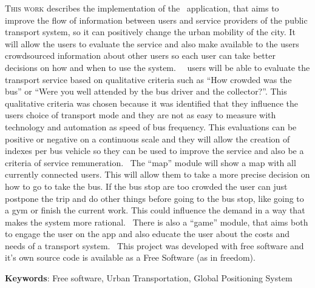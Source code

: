 \lettrine{T}{his work} describes the implementation of the \trilhasp~application, that aims to improve the flow of information between users and service providers of the public transport system, so it can positively change the urban mobility of the city. It will allow the users to evaluate the service and also make available to the users crowdsourced information about other users so each user can take better decisions on how and when to use the system.%
%
~\trilhasp~users will be able to evaluate the transport service based on qualitative criteria such as ``How crowded was the bus'' or ``Were you well attended by the bus driver and the collector?''. This qualitative criteria was chosen because it was identified that they influence the users choice of transport mode and they are not as easy to measure with technology and automation as speed of bus frequency. This evaluations can be positive or negative on a continuous scale and they will allow the creation of indexes per bus vehicle so they can be used to improve the service and also be a criteria of service remuneration.%
%
~The ``map'' module will show a map with all currently connected users. This will allow them to take a more precise decision on how to go to take the bus. If the bus stop are too crowded the user can just postpone the trip and do other things before going to the bus stop, like going to a gym or finish the current work. This could influence the demand in a way that makes the system more rational.%
%
~There is also a ``game'' module, that aims both to engage the user on the app and also educate the user about the costs and needs of a transport system.%
%
~This project was developed with free software and it's own source code is available as a Free Software (as in freedom).

\vspace{\onelineskip}

\vfill

\noindent

\textbf{Keywords}: Free software, Urban Transportation, Global Positioning System
